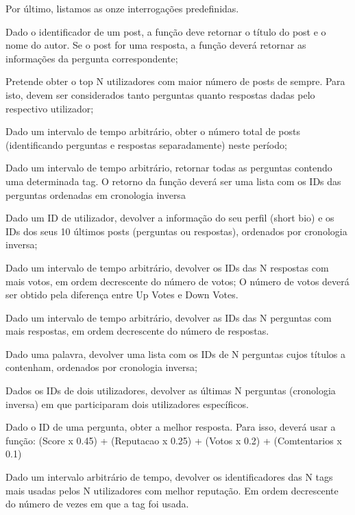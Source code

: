 \documentclass[a4paper]{report}
\begin{document}
Por último, listamos as onze interrogações predefinidas.
\begin{itemize}

\begin{item} Dado o identificador de um post, a função deve retornar
o título do post e o nome do autor. Se o post for uma resposta, a função deverá
retornar as informações da pergunta correspondente;\end{item}
\begin{item} Pretende obter o top N utilizadores com maior número
de posts de sempre. Para isto, devem ser considerados tanto perguntas
quanto respostas dadas pelo respectivo utilizador;\end{item}
\begin{item} Dado um intervalo de tempo arbitrário, obter o número
total de posts (identificando perguntas e respostas separadamente) neste
período;\end{item}
\begin{item} Dado um intervalo de tempo arbitrário, retornar todas
as perguntas contendo uma determinada tag. O retorno da função deverá ser
uma lista com os IDs das perguntas ordenadas em cronologia inversa\end{item}
\begin{item} Dado um ID de utilizador, devolver a informação do
seu perfil (short bio) e os IDs dos seus 10 últimos posts (perguntas ou respostas),
ordenados por cronologia inversa;\end{item}
\begin{item} Dado um intervalo de tempo arbitrário, devolver os IDs das N
respostas com mais votos, em ordem decrescente do número de votos; O número de
votos deverá ser obtido pela diferença entre Up Votes e Down Votes.\end{item}
\begin{item} Dado um intervalo de tempo arbitrário, devolver as IDs das N
perguntas com mais respostas, em ordem decrescente do número de respostas.\end{item}
\begin{item} Dado uma palavra, devolver uma lista com os IDs de N perguntas cujos
títulos a contenham, ordenados por cronologia inversa;\end{item}
\begin{item} Dados os IDs de dois utilizadores, devolver as últimas N perguntas
(cronologia inversa) em que participaram dois utilizadores específicos.\end{item}
\begin{item} Dado o ID de uma pergunta, obter a melhor resposta.
Para isso, deverá usar a função:
(Score x 0.45) + (Reputacao x 0.25) + (Votos x 0.2) + (Comtentarios x 0.1)\end{item}
\begin{item} Dado um intervalo arbitrário de tempo, devolver os identificadores
das N tags mais usadas pelos N utilizadores com melhor reputação.
Em ordem decrescente do número de vezes em que a tag foi usada.\end{item}

\end{itemize}
\end{document}
